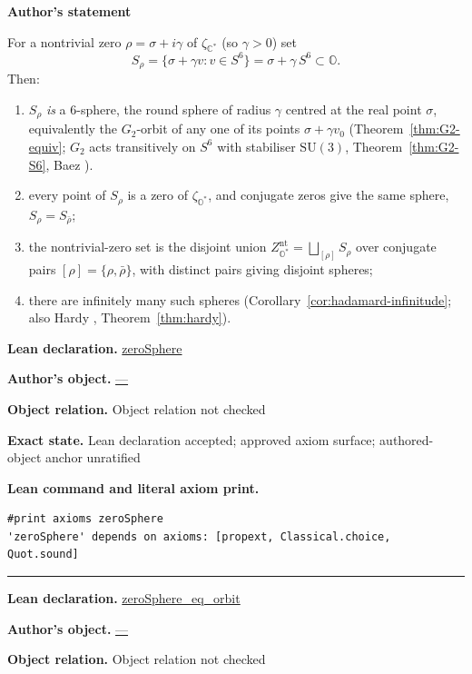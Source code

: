 \documentclass[11pt]{article}
\newcommand{\OO}{\mathbb{O}}
\newcommand{\CC}{\mathbb{C}}
\newcommand{\Ostar}{\OO^{*}}
\newcommand{\Cstar}{\CC^{*}}
\newcommand{\zetaO}{\zeta_{\Ostar}}
\newcommand{\zetaC}{\zeta_{\Cstar}}
\providecommand{\Gtwo}{G_2}
\theoremstyle{plain}
\theoremstyle{definition}
\theoremstyle{remark}
\begin{document}
\medskip
\begin{tcolorbox}[provenancecard,title={35. Theorem - Nontrivial zeros are infinitely many disjoint \$6\$-spheres},title after break={35. Theorem - Nontrivial zeros are infinitely many disjoint \$6\$-spheres (continued)}]
\textbf{Author's statement}\par
For a nontrivial zero $\rho=\sigma+i\gamma$ of $\zetaC$ (so $\gamma>0$) set
\[
S_\rho=\{\sigma+\gamma v:v\in S^6\}=\sigma+\gamma\,S^6\subset\OO .
\]
Then:
\begin{enumerate}[leftmargin=2.4em]
\item[(i)] $S_\rho$ \emph{is} a $6$-sphere, the round sphere of radius $\gamma$ centred
  at the real point $\sigma$, equivalently the $\Gtwo$-orbit of any one of its points
  $\sigma+\gamma v_0$ (Theorem~\ref{thm:G2-equiv}; $\Gtwo$ acts transitively on $S^6$ with
  stabiliser $\mathrm{SU}(3)$, Theorem~\ref{thm:G2-S6}, Baez \cite{Baez02}).
\item[(ii)] every point of $S_\rho$ is a zero of $\zetaO$, and conjugate zeros give the
  same sphere, $S_\rho=S_{\bar\rho}$;
\item[(iii)] the nontrivial-zero set is the disjoint union
  $Z^{\mathrm{nt}}_{\Ostar}=\bigsqcup_{[\rho]}S_\rho$ over conjugate pairs
  $[\rho]=\{\rho,\bar\rho\}$, with distinct pairs giving disjoint spheres;
\item[(iv)] there are infinitely many such spheres (Corollary~\ref{cor:hadamard-infinitude};
  also Hardy \cite{Hardy14}, Theorem~\ref{thm:hardy}).
\end{enumerate}
\tcblower
\textbf{Lean declaration.} \url{zeroSphere}
\par\textbf{Author's object.} \url{—}
\par\textbf{Object relation.} Object relation not checked
\par\textbf{Exact state.} Lean declaration accepted; approved axiom surface; authored-object anchor unratified
\par\smallskip\textbf{Lean command and literal axiom print.}
\begin{Verbatim}[breaklines=true,breakanywhere=true,fontsize=\small]
#print axioms zeroSphere
'zeroSphere' depends on axioms: [propext, Classical.choice, Quot.sound]
\end{Verbatim}
\medskip\hrule\medskip
\textbf{Lean declaration.} \url{zeroSphere_eq_orbit}
\par\textbf{Author's object.} \url{—}
\par\textbf{Object relation.} Object relation not checked

\end{tcolorbox}
\end{document}
